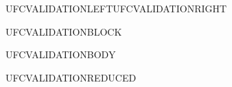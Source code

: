 \documentclass{abntexto-ufc}
\begin{document}
\textual

\noindent UFCVALIDATIONLEFT\hfill UFCVALIDATIONRIGHT\par

\vspace*{0.48\textheight}
\noindent UFCVALIDATIONBLOCK\par

\vspace{2\baselineskip}
\noindent UFCVALIDATIONBODY\par

{\fontsize{10pt}{12pt}\selectfont\noindent UFCVALIDATIONREDUCED\par}
\end{document}
